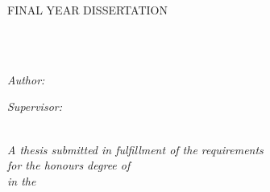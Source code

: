 \documentclass[
11pt, %
oneside,
english,
doublespacing, 
nolistspacing,
liststotoc, %
toctotoc, %
parskip, %
headsepline, %
consistentlayout, %
]{COVID-19 Detection - agl2} %
\author{Alister George Luiz} %
\begin{document}
\frontmatter %

\pagestyle{plain} %


\begin{titlepage}
\begin{center}

\vspace*{.06\textheight}
{\scshape\LARGE \univname\par}\vspace{1.5cm} %
\textsc{\Large FINAL YEAR DISSERTATION}\\[0.5cm] %

\HRule \\[0.4cm] %
{\huge \bfseries \ttitle\par}\vspace{0.4cm} %
\HRule \\[1.5cm] %
 
\begin{minipage}[t]{0.4\textwidth}
\begin{flushleft} \large
\emph{Author:}\\
\href{mailto:agl2@hw.ac.uk}{\authorname} %
\end{flushleft}
\end{minipage}
\begin{minipage}[t]{0.4\textwidth}
\begin{flushright} \large
\emph{Supervisor:} \\
\href{mailto:H.RagabHassen@hw.ac.uk}{\supname} %
\end{flushright}
\end{minipage}\\[2cm]
 

\large \textit{A thesis submitted in fulfillment of the requirements\\ for the honours degree of \degreename}\\[0.3cm] %
\textit{in the}\\[0.4cm]
\deptname\\[1cm] %
 

\end{center}
\end{titlepage}
\end{document}
